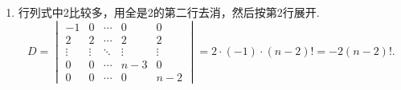 \documentclass[12pt,fontset=fandol]{ctexart}
\begin{document}
\begin{solve}
\begin{enumerate}
                \item 行列式中2比较多，用全是2的第二行去消，然后按第2行展开.
                      \[D=\begin{vmatrix}
                              -1     & 0      & \cdots & 0      & 0      \\
                              2      & 2      & \cdots & 2      & 2      \\
                              \vdots & \vdots & \ddots & \vdots & \vdots \\
                              0      & 0      & \cdots & n-3    & 0      \\
                              0      & 0      & \cdots & 0      & n-2
                          \end{vmatrix}=2\cdot(-1)\cdot(n-2)!=-2(n-2)!.\]


\end{enumerate}
\end{solve}
\end{document}
